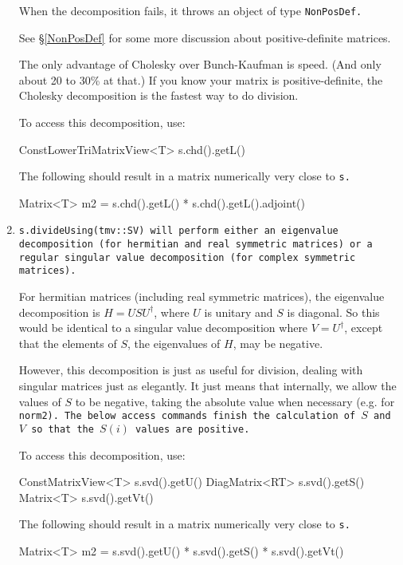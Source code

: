 \begin{enumerate}
When the decomposition fails, it throws an object of type
\tt{NonPosDef}.

See \S\ref{NonPosDef} for some more discussion about positive-definite
matrices.

The only advantage of Cholesky over Bunch-Kaufman is speed.  (And only about
20 to 30\% at that.)  If you know your 
matrix is positive-definite, the Cholesky decomposition is the fastest way to 
do division.

To access this decomposition, use:
\begin{tmvcode}
ConstLowerTriMatrixView<T> s.chd().getL()
\end{tmvcode}
The following should result in a matrix numerically very close to \tt{s}.
\begin{tmvcode}
Matrix<T> m2 = s.chd().getL() * s.chd().getL().adjoint()
\end{tmvcode}

\item
\tt{s.divideUsing(tmv::SV)} will perform either an eigenvalue decomposition
(for hermitian and real symmetric matrices) or a regular singular value
decomposition (for complex symmetric matrices).

For hermitian matrices (including real symmetric matrices), 
the eigenvalue decomposition is $H = U S U^\dagger$, where $U$ is
unitary and $S$ is diagonal.  So this would be identical to a singular
value decomposition where $V = U^\dagger$, 
except that the elements of $S$, the eigenvalues of $H$, may be negative.

However, this decomposition is just as useful for division, dealing with singular
matrices just as elegantly.  It just means that internally, we allow the values
of $S$ to be negative, taking the absolute value when necessary (e.g. for \tt{norm2}).
The below access commands finish the calculation of $S$ and $V$ so that the $S(i)$
values are positive. 

To access this decomposition, use:
\begin{tmvcode}
ConstMatrixView<T> s.svd().getU()
DiagMatrix<RT> s.svd().getS()
Matrix<T> s.svd().getVt()
\end{tmvcode}
The following should result in a matrix numerically very close to \tt{s}.
\begin{tmvcode}
Matrix<T> m2 = s.svd().getU() * s.svd().getS() * s.svd().getVt()
\end{tmvcode}


\end{enumerate}
